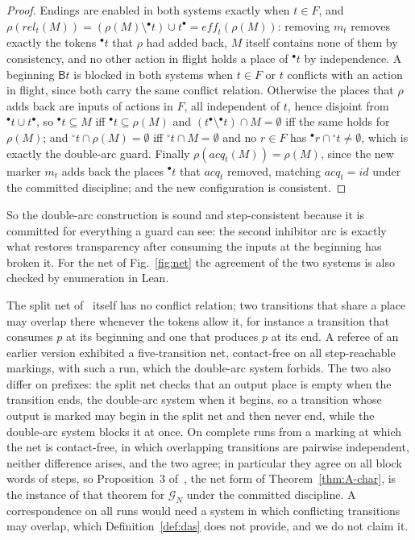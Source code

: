 \documentclass[preprint,12pt]{elsarticle}
\theoremstyle{plain}
\theoremstyle{definition}
\newcommand{\eff}{\mathit{eff}}
\newcommand{\acq}{\mathit{acq}}
\newcommand{\rel}{\mathit{rel}}
\newcommand{\id}{\mathit{id}}
\newcommand{\B}[1]{\mathsf{B}#1}
\newcommand{\G}{\mathcal{G}}
\begin{document}
\begin{proof}
Endings are enabled in both systems exactly when $t \in F$, and $\rho(\rel_t(M)) = (\rho(M) \setminus {}^\bullet t) \cup t^\bullet = \eff_t(\rho(M))$: removing $m_t$ removes exactly the tokens ${}^\bullet t$ that $\rho$ had added back, $M$ itself contains none of them by consistency, and no other action in flight holds a place of ${}^\bullet t$ by independence. A beginning $\B{t}$ is blocked in both systems when $t \in F$ or $t$ conflicts with an action in flight, since both carry the same conflict relation. Otherwise the places that $\rho$ adds back are inputs of actions in $F$, all independent of $t$, hence disjoint from ${}^\bullet t \cup t^\bullet$, so ${}^\bullet t \subseteq M$ iff ${}^\bullet t \subseteq \rho(M)$ and $(t^\bullet \setminus {}^\bullet t) \cap M = \emptyset$ iff the same holds for $\rho(M)$; and ${}^\circ t \cap \rho(M) = \emptyset$ iff ${}^\circ t \cap M = \emptyset$ and no $r \in F$ has ${}^\bullet r \cap {}^\circ t \neq \emptyset$, which is exactly the double-arc guard. Finally $\rho(\acq_t(M)) = \rho(M)$, since the new marker $m_t$ adds back the places ${}^\bullet t$ that $\acq_t$ removed, matching $\acq_t = \id$ under the committed discipline; and the new configuration is consistent.
\end{proof}

So the double-arc construction is sound and step-consistent because it is committed for everything a guard can see: the second inhibitor arc is exactly what restores transparency after consuming the inputs at the beginning has broken it. For the net of Fig.~\ref{fig:net} the agreement of the two systems is also checked by enumeration in Lean.

The split net of~\cite{AlqarniJanicki2015,AlqarniJanicki2018} itself has no conflict relation; two transitions that share a place may overlap there whenever the tokens allow it, for instance a transition that consumes $p$ at its beginning and one that produces $p$ at its end. A referee of an earlier version exhibited a five-transition net, contact-free on all step-reachable markings, with such a run, which the double-arc system forbids. The two also differ on prefixes: the split net checks that an output place is empty when the transition ends, the double-arc system when it begins, so a transition whose output is marked may begin in the split net and then never end, while the double-arc system blocks it at once. On complete runs from a marking at which the net is contact-free, in which overlapping transitions are pairwise independent, neither difference arises, and the two agree; in particular they agree on all block words of steps, so Proposition~3 of~\cite{AlqarniJanicki2018}, the net form of Theorem~\ref{thm:A-char}, is the instance of that theorem for $\G_N$ under the committed discipline. A correspondence on all runs would need a system in which conflicting transitions may overlap, which Definition~\ref{def:das} does not provide, and we do not claim it.
\end{document}
